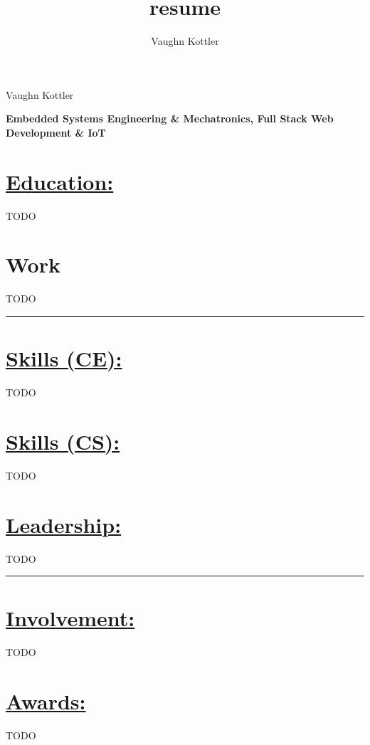 \documentclass[letterpaper,10pt]{article}
\title{resume}
\author{Vaughn Kottler}
\begin{document}
\begin{center}\Huge
    Vaughn Kottler
\end{center}

\begin{center}\large
    \color{maroon}\textbf{
        Embedded Systems Engineering \& Mechatronics, Full Stack Web Development \& IoT
    }
    
\end{center}

\section*{\underline{Education:}}

TODO

\section*{Work}

TODO

\begin{center}
\noindent\rule{7.5in}{0.5pt}
\end{center}

\section*{\underline{Skills (CE):}}

TODO

\section*{\underline{Skills (CS):}}

TODO

\section*{\underline{Leadership:}}

TODO

\begin{center}
\noindent\rule{7.5in}{0.5pt}
\end{center}

\section*{\underline{Involvement:}}

TODO

\section*{\underline{Awards:}}

TODO
\end{document}
